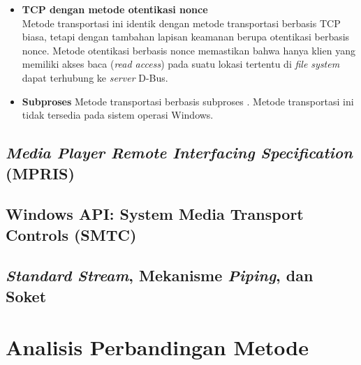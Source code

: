 \begin{itemize}
    \item \textbf{TCP dengan metode otentikasi nonce}\\
    Metode transportasi ini identik dengan metode transportasi berbasis TCP biasa, tetapi dengan tambahan lapisan keamanan berupa otentikasi berbasis nonce. Metode otentikasi berbasis nonce memastikan bahwa hanya klien yang memiliki akses baca (\textit{read access}) pada suatu lokasi tertentu di \textit{file system} dapat terhubung ke \textit{server} D-Bus.

    \item \textbf{Subproses}
    Metode transportasi berbasis subproses . Metode transportasi ini tidak tersedia pada sistem operasi Windows.
\end{itemize}

\subsection{\textit{Media Player Remote Interfacing Specification} (MPRIS)}

\subsection{Windows API: System Media Transport Controls (SMTC)}

\subsection{\textit{Standard Stream}, Mekanisme \textit{Piping}, dan Soket}

\section{Analisis Perbandingan Metode}

